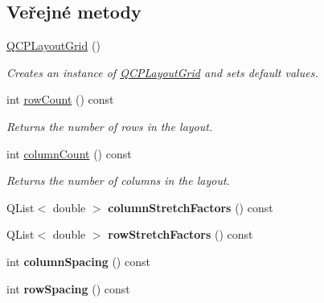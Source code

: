 \subsection*{Veřejné metody}
\begin{DoxyCompactItemize}
\item 
\hypertarget{classQCPLayoutGrid_ab2a4c1587dc8aed4c41c509c8d8d2a64}{}\hyperlink{classQCPLayoutGrid_ab2a4c1587dc8aed4c41c509c8d8d2a64}{Q\+C\+P\+Layout\+Grid} ()\label{classQCPLayoutGrid_ab2a4c1587dc8aed4c41c509c8d8d2a64}

\begin{DoxyCompactList}\small\item\em Creates an instance of \hyperlink{classQCPLayoutGrid}{Q\+C\+P\+Layout\+Grid} and sets default values. \end{DoxyCompactList}\item 
int \hyperlink{classQCPLayoutGrid_af8e6c7a05864ebe610c87756c7b9079c}{row\+Count} () const 
\begin{DoxyCompactList}\small\item\em Returns the number of rows in the layout. \end{DoxyCompactList}\item 
int \hyperlink{classQCPLayoutGrid_ac39074eafd148b82d0762090f258189e}{column\+Count} () const 
\begin{DoxyCompactList}\small\item\em Returns the number of columns in the layout. \end{DoxyCompactList}\item 
\hypertarget{classQCPLayoutGrid_a39bd7994d00687d1b9defef6f1bda835}{}Q\+List$<$ double $>$ {\bfseries column\+Stretch\+Factors} () const \label{classQCPLayoutGrid_a39bd7994d00687d1b9defef6f1bda835}

\item 
\hypertarget{classQCPLayoutGrid_a3744496abf73c8e3b464181d63bb20a7}{}Q\+List$<$ double $>$ {\bfseries row\+Stretch\+Factors} () const \label{classQCPLayoutGrid_a3744496abf73c8e3b464181d63bb20a7}

\item 
\hypertarget{classQCPLayoutGrid_a3de19753fdca81194458cb15156f7315}{}int {\bfseries column\+Spacing} () const \label{classQCPLayoutGrid_a3de19753fdca81194458cb15156f7315}

\item 
\hypertarget{classQCPLayoutGrid_abccdd33c1b284feb6df90fa02f23d9a3}{}int {\bfseries row\+Spacing} () const \label{classQCPLayoutGrid_abccdd33c1b284feb6df90fa02f23d9a3}


\end{DoxyCompactItemize}
